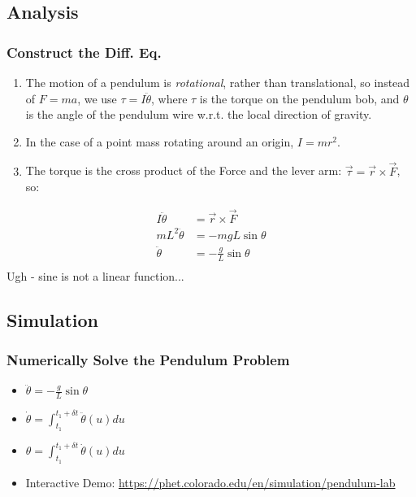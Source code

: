\documentclass[pdf,hideothersubsections]{beamer}
\begin{document}
\subsection{Analysis}
\begin{frame}
\frametitle{Construct the Diff. Eq.}
\begin{enumerate}
\item The motion of a pendulum is \emph{rotational}, rather than translational, so instead of $F = m a$, we use $\tau = I \ddot{\theta}$, where $\tau$ is the torque on the pendulum bob, and $\theta$ is the angle of the pendulum wire w.r.t. the local direction of gravity. \\
\pause
\item In the case of a point mass rotating around an origin, $I = m r^2$. \\
\pause
\item The torque is the cross product of the Force and the lever arm: $\vec{\tau} = \vec{r} \times \vec{F}$, so: \\
\end{enumerate}
\pause
\begin{align*}
I \ddot{\theta} &= \vec{r} \times \vec{F} \\
m L^2 \ddot{\theta} &= -m g L \sin{\theta} \\
\ddot{\theta} &= -\frac{g}{L} \sin{\theta} \\
\end{align*}
\pause
Ugh - sine is not a linear function...

\end{frame}
\subsection{Simulation}
\begin{frame}
\frametitle{Numerically Solve the Pendulum Problem}
\begin{itemize}
\item $\ddot{\theta} = -\frac{g}{L} \sin{\theta}$
\pause
\item $\dot{\theta} = \int_{t_1}^{t_1 + \delta t} \ddot{\theta}(u) du $
\pause
\item $\theta = \int_{t_1}^{t_1 + \delta t} \dot{\theta}(u) du $
\pause
\item Interactive Demo: \url{https://phet.colorado.edu/en/simulation/pendulum-lab}
\end{itemize}
\end{frame}
\end{document}
